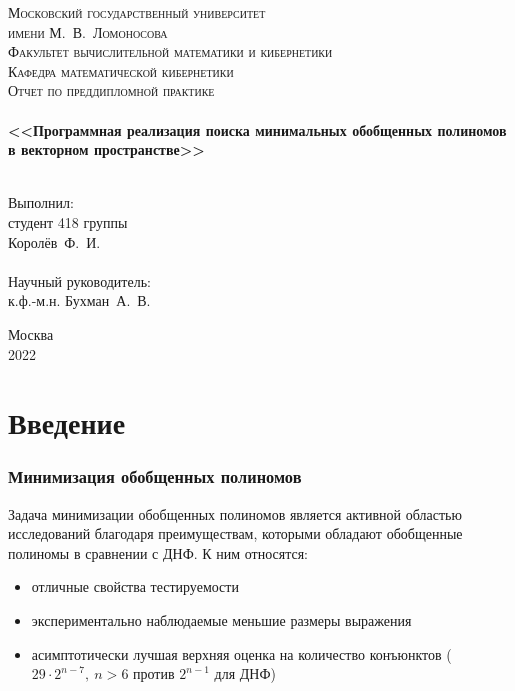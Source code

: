 \documentclass[a4paper,12pt,titlepage,finall]{article}
\begin{document}
\begin{titlepage}
    \begin{center}
    \textsc{\small Московский государственный университет \\имени М.~В.~Ломоносова\\
    Факультет вычислительной математики и кибернетики\\Кафедра математической кибернетики\\}
    \vfill
    \textsc{\Large Отчет по преддипломной практике}\\
    ~\\
    \textbf{\large <<Программная реализация поиска минимальных обобщенных полиномов в векторном пространстве>>}\\
    ~\\
    \end{center}
    \begin{flushright}
    \vfill {Выполнил:\\
    студент 418 группы\\
    Королёв~Ф.~И.\\
    ~\\
    Научный руководитель:\\
    к.ф.-м.н. Бухман~А.~В.}
    \end{flushright}
    \begin{center}
    \vfill
    {\small Москва\\2022}
    \end{center}
\end{titlepage}

\tableofcontents
\newpage

\section{Введение}

\subsubsection{Минимизация обобщенных полиномов}

Задача минимизации обобщенных полиномов является активной областью исследований благодаря преимуществам, которыми обладают обобщенные полиномы в сравнении с ДНФ. К ним относятся:
\begin{itemize}
    \item отличные свойства тестируемости \cite{exorcism4}
    \item экспериментально наблюдаемые меньшие размеры выражения
    \item асимптотически лучшая верхняя оценка на количество конъюнктов ($ 29 \cdot 2^{n - 7}, \ n > 6 $ \cite{bound} против $ 2^{n - 1} $ для ДНФ)
\end{itemize}
\end{document}
